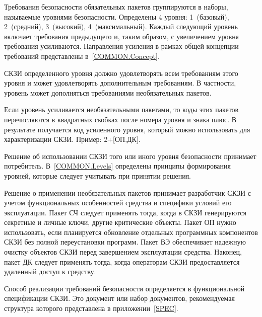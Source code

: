 Требования безопасности обязательных пакетов группируются в наборы, называемые 
уровнями безопасности. 
%
Определены 4 уровня: 1~(базовый), 2~(средний), 3~(высокий), 4~(максимальный).
%
Каждый следующий уровень включает требования предыдущего и, таким образом,
с увеличением уровня требования усиливаются.
%
Направления усиления в рамках общей концепции требований представлены 
в~\ref{COMMON.Concept}.

\begin{note}
\end{note}

СКЗИ определенного уровня должно удовлетворять всем требованиям этого уровня
и может удовлетворять дополнительным требованиям.
%
В частности, уровень может дополняться требованиями необязательных пакетов.

\begin{note}
\end{note}

Если уровень усиливается необязательными пакетами, то коды этих пакетов 
перечисляются в квадратных скобках после номера уровня и знака плюс. 
В результате получается код усиленного уровня, который можно использовать 
для характеризации СКЗИ. Пример: 2+[ОП,ДК].

Решение об использовании СКЗИ того или иного уровня безопасности принимает 
потребитель. В~\ref{COMMON.Levels} определены принципы формирования уровней, 
которые следует учитывать при принятии решения.

Решение о применении необязательных пакетов принимает разработчик СКЗИ с учетом 
функциональных особенностей средства и специфики условий его эксплуатации. 
%
Пакет СЧ следует применять тогда, когда в СКЗИ генерируются секретные и личные 
ключи, другие критические объекты.
%
Пакет ОП нужно использовать, если планируется обновление отдельных программных 
компонентов СКЗИ без полной переустановки программ.  
%
Пакет ВЭ обеспечивает надежную очистку объектов СКЗИ перед завершением 
эксплуатации средства.
%
Наконец, пакет ДК следует применять тогда, когда операторам СКЗИ 
предоставляется удаленный доступ к средству.

Способ реализации требований безопасности определяется
в функциональной спецификации СКЗИ. Это документ или набор документов,
рекомендуемая структура которого представлена в приложении~\ref{SPEC}.
